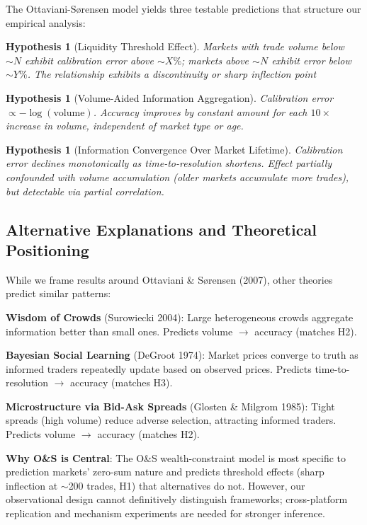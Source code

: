 \documentclass[a4paper,11pt]{article}
\theoremstyle{plain}
\newtheorem{hypothesis}[section]{Hypothesis}
\theoremstyle{definition}
\begin{document}
The Ottaviani-Sørensen model yields three testable predictions that structure our empirical analysis:

\begin{hypothesis}[Liquidity Threshold Effect]
Markets with trade volume below $\sim N$ exhibit calibration error above $\sim X\%$; markets above $\sim N$ exhibit error below $\sim Y\%$. The relationship exhibits a discontinuity or sharp inflection point
\end{hypothesis}

\begin{hypothesis}[Volume-Aided Information Aggregation]
Calibration error $\propto -\log(\text{volume})$. Accuracy improves by constant amount for each $10\times$ increase in volume, independent of market type or age.
\end{hypothesis}

\begin{hypothesis}[Information Convergence Over Market Lifetime]
Calibration error declines monotonically as time-to-resolution shortens. Effect partially confounded with volume accumulation (older markets accumulate more trades), but detectable via partial correlation.
\end{hypothesis}

\subsection{Alternative Explanations and Theoretical Positioning}

While we frame results around Ottaviani \& Sørensen (2007), other theories predict similar patterns:

\textbf{Wisdom of Crowds} (Surowiecki 2004): Large heterogeneous crowds aggregate information better than small ones. Predicts volume $\to$ accuracy (matches H2).

\textbf{Bayesian Social Learning} (DeGroot 1974): Market prices converge to truth as informed traders repeatedly update based on observed prices. Predicts time-to-resolution $\to$ accuracy (matches H3).

\textbf{Microstructure via Bid-Ask Spreads} (Glosten \& Milgrom 1985): Tight spreads (high volume) reduce adverse selection, attracting informed traders. Predicts volume $\to$ accuracy (matches H2).

\textbf{Why O\&S is Central}: The O\&S wealth-constraint model is most specific to prediction markets' zero-sum nature and predicts threshold effects (sharp inflection at $\sim$200 trades, H1) that alternatives do not. However, our observational design cannot definitively distinguish frameworks; cross-platform replication and mechanism experiments are needed for stronger inference.
\end{document}
